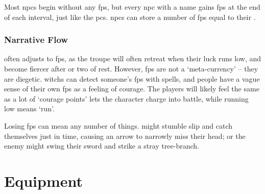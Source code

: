 \begin{multicols}{2}
Most \glspl{npc} begin without any \glspl{fp}, but every \gls{npc} with a name gains \glspl{fp} at the end of each \gls{interval}, just like the \glspl{pc}.
\Glspl{npc} can store a number of \glspl{fp} equal to their .

\subsubsection{Narrative Flow}
often adjusts to \glspl{fp}, as the troupe will often retreat when their luck runs low, and become fiercer after  or two of rest.
However, \glspl{fp} are not a `meta-currency' -- they are diegetic.
\Glspl{witch} can detect someone's \glspl{fp} with \glspl{spell}, and people have a vague sense of their own \glspl{fp} as a feeling of courage.
The players will likely feel the same as a lot of `courage points' lets the character charge into battle, while running low means `run'.

Losing \glspl{fp} can mean any number of things.
 might stumble slip and catch themselves just in time, causing an arrow to narrowly miss their head; or the enemy might swing their sword and strike a stray tree-branch.

\end{multicols}


\section{Equipment}

